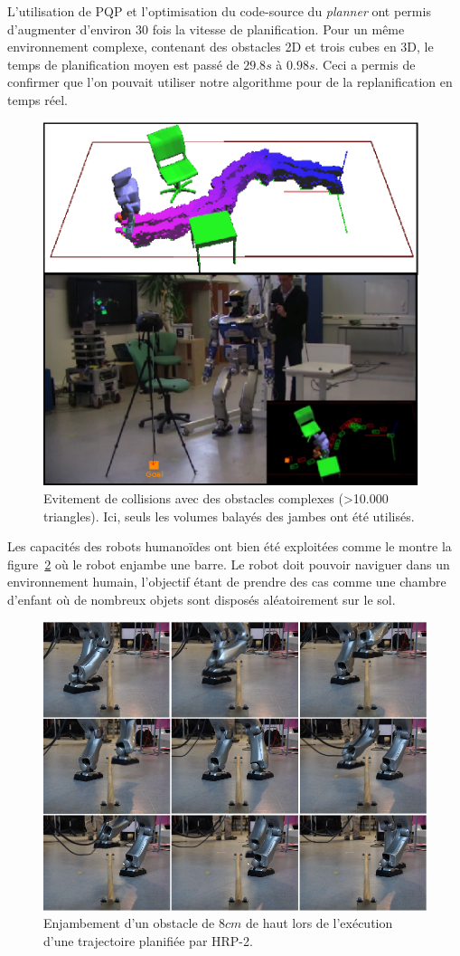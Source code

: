 L'utilisation de PQP et l'optimisation du code-source du \emph{planner} ont permis d'augmenter d'environ 30 fois la vitesse de planification. Pour un même environnement complexe, contenant des obstacles 2D et trois cubes en 3D, le temps de planification moyen est passé de $29.8s$ à $0.98s$. Ceci a permis de confirmer que l'on pouvait utiliser notre algorithme pour de la replanification en temps réel.


\begin{figure}[h]
\begin{center}
\includegraphics[width=11.0cm]{images/SweptDemo.png}
\caption{Evitement de collisions avec des obstacles complexes (>10.000 triangles). Ici, seuls les volumes balayés des jambes ont été utilisés.}
\label{fig:demo}
\end{center}
\end{figure}

Les capacités des robots humanoïdes ont bien été exploitées comme le montre la figure~\ref{fig:over} où le robot enjambe une barre. Le robot doit pouvoir naviguer dans un environnement humain, l'objectif étant de prendre des cas comme une chambre d'enfant où de nombreux objets sont disposés aléatoirement sur le sol.

\begin{figure}[h]
\begin{center}
\includegraphics[width=13.0cm]{images/over_small.png}
\caption{Enjambement d'un obstacle de $8cm$ de haut lors de l'exécution d'une trajectoire planifiée par HRP-2.}
\label{fig:over}
\end{center}
\end{figure}

\newpage
